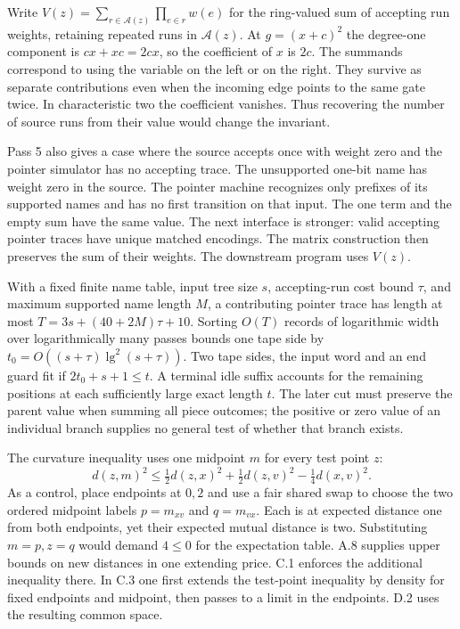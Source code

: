 
\newpage
{}
Write $V(z)=\sum_{r\in\mathcal A(z)}\prod_{e\in r}w(e)$ for the ring-valued sum of accepting run weights, retaining repeated runs in $\mathcal A(z)$. At $g=(x+c)^2$ the degree-one component is $cx+xc=2cx$, so the coefficient of $x$ is $2c$. The summands correspond to using the variable on the left or on the right. They survive as separate contributions even when the incoming edge points to the same gate twice. In characteristic two the coefficient vanishes. Thus recovering the number of source runs from their value would change the invariant.

Pass 5 also gives a case where the source accepts once with weight zero and the pointer simulator has no accepting trace. The unsupported one-bit name has weight zero in the source. The pointer machine recognizes only prefixes of its supported names and has no first transition on that input. The one term and the empty sum have the same value. The next interface is stronger: valid accepting pointer traces have unique matched encodings. The matrix construction then preserves the sum of their weights. The downstream program uses $V(z)$.

With a fixed finite name table, input tree size $s$, accepting-run cost bound $\tau$, and maximum supported name length $M$, a contributing pointer trace has length at most $T=3s+(40+2M)\tau+10$. Sorting $O(T)$ records of logarithmic width over logarithmically many passes bounds one tape side by $t_0=O((s+\tau)\lg^2(s+\tau))$. Two tape sides, the input word and an end guard fit if $2t_0+s+1\le t$. A terminal idle suffix accounts for the remaining positions at each sufficiently large exact length $t$. The later cut must preserve the parent value when summing all piece outcomes; the positive or zero value of an individual branch supplies no general test of whether that branch exists.

The curvature inequality uses one midpoint $m$ for every test point $z$:
\[
 d(z,m)^2\le\tfrac12 d(z,x)^2+\tfrac12 d(z,v)^2-\tfrac14 d(x,v)^2 .
\]
As a control, place endpoints at $0,2$ and use a fair shared swap to choose the two ordered midpoint labels $p=m_{xv}$ and $q=m_{vx}$. Each is at expected distance one from both endpoints, yet their expected mutual distance is two. Substituting $m=p,z=q$ would demand $4\le0$ for the expectation table. A.8 supplies upper bounds on new distances in one extending price. C.1 enforces the additional inequality there. In C.3 one first extends the test-point inequality by density for fixed endpoints and midpoint, then passes to a limit in the endpoints. D.2 uses the resulting common space.

